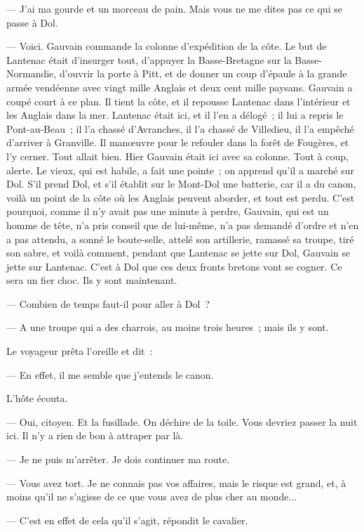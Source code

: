 \documentclass[french,twoside]{book} %
\begin{document}
— J’ai ma gourde et un morceau de pain. Mais vous ne me dites pas ce qui se passe à Dol.\par
— Voici. Gauvain commande la colonne d’expédition de la côte. Le but de Lantenac était d’insurger tout, d’appuyer la Basse-Bretagne sur la Basse-Normandie, d’ouvrir la porte à Pitt, et de donner un coup d’épaule à la grande armée vendéenne avec vingt mille Anglais et deux cent mille paysans. Gauvain a coupé court à ce plan. Il tient la côte, et il repousse Lantenac dans l’intérieur et les Anglais dans la mer. Lantenac était ici, et il l’en a délogé ; il lui a repris le Pont-au-Beau ; il l’a chassé d’Avranches, il l’a chassé de Villedieu, il l’a empêché d’arriver à Granville. Il manœuvre pour le refouler dans la forêt de Fougères, et l’y cerner. Tout allait bien. Hier Gauvain était ici avec sa colonne. Tout à coup, alerte. Le vieux, qui est habile, a fait une pointe ; on apprend qu’il a marché sur Dol. S’il prend Dol, et s’il établit sur le Mont-Dol une batterie, car il a du canon, voilà un point de la côte où les Anglais peuvent aborder, et tout est perdu. C’est pourquoi,  comme il n’y avait pas une minute à perdre, Gauvain, qui est un homme de tête, n’a pris conseil que de lui-même, n’a pas demandé d’ordre et n’en a pas attendu, a sonné le boute-selle, attelé son artillerie, ramassé sa troupe, tiré son sabre, et voilà comment, pendant que Lantenac se jette sur Dol, Gauvain se jette sur Lantenac. C’est à Dol que ces deux fronts bretons vont se cogner. Ce sera un fier choc. Ils y sont maintenant.\par
— Combien de temps faut-il pour aller à Dol ?\par
— A une troupe qui a des charrois, au moins trois heures ; mais ils y sont.\par
Le voyageur prêta l’oreille et dit :\par
— En effet, il me semble que j’entends le canon.\par
L’hôte écouta.\par
— Oui, citoyen. Et la fusillade. On déchire de la toile. Vous devriez passer la nuit ici. Il n’y a rien de bon à attraper par là.\par
— Je ne puis m’arrêter. Je dois continuer ma route.\par
— Vous avez tort. Je ne connais pas vos affaires, mais le risque est grand, et, à moins qu’il ne s’agisse de ce que vous avez de plus cher au monde...\par
— C’est en effet de cela qu’il s’agit, répondit le cavalier.\par
\end{document}
